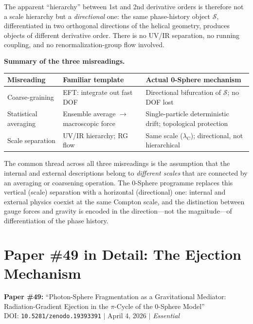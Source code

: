 \documentclass[12pt,letterpaper]{article}
\newcommand{\doilink}[1]{\texttt{#1}}
\newcommand{\lambdaC}{\lambda_{\mathrm{C}}}
\newcommand{\calS}{\mathcal{S}}
\begin{document}
The apparent ``hierarchy'' between 1st and 2nd derivative orders is
therefore not a scale hierarchy but a \emph{directional} one:
the same phase-history object $\calS$, differentiated in two orthogonal
directions of the helical geometry, produces objects of different
derivative order.
There is no UV/IR separation, no running coupling, and no
renormalization-group flow involved.

\begin{mdframed}[style=chainbox]
\textbf{Summary of the three misreadings.}
\renewcommand{\arraystretch}{1.3}
\begin{tabular}{p{3.0cm}p{4.5cm}p{5.0cm}}
\toprule
\textbf{Misreading} & \textbf{Familiar template} & \textbf{Actual 0-Sphere mechanism} \\
\midrule
Coarse-graining &
  EFT: integrate out fast DOF &
  Directional bifurcation of $\calS$; no DOF lost \\
\addlinespace[0.15cm]
Statistical averaging &
  Ensemble average $\to$ macroscopic force &
  Single-particle deterministic drift; topological protection \\
\addlinespace[0.15cm]
Scale separation &
  UV/IR hierarchy; RG flow &
  Same scale ($\lambdaC$); directional, not hierarchical \\
\bottomrule
\end{tabular}
\end{mdframed}

\noindent The common thread across all three misreadings is the assumption
that the internal and external descriptions belong to \emph{different scales}
that are connected by an averaging or coarsening operation.
The 0-Sphere programme replaces this vertical (scale) separation with
a horizontal (directional) one:
internal and external physics coexist at the same Compton scale,
and the distinction between gauge forces and gravity is encoded in
the direction---not the magnitude---of differentiation of the phase history.

\clearpage

\section{\texorpdfstring{Paper \#49 in Detail: The Ejection Mechanism}{Paper \#49 in Detail: The Ejection Mechanism}}
\label{sec:p49}

\begin{mdframed}[style=bluebox]
\textbf{\textcolor{threadblue}{Paper \#49:}}
``Photon-Sphere Fragmentation as a Gravitational Mediator:
Radiation-Gradient Ejection in the $\pi$-Cycle of the 0-Sphere Model''\\
DOI: \doilink{10.5281/zenodo.19393391} $|$ April 4, 2026 $|$ \textit{Essential}
\end{mdframed}
\end{document}
